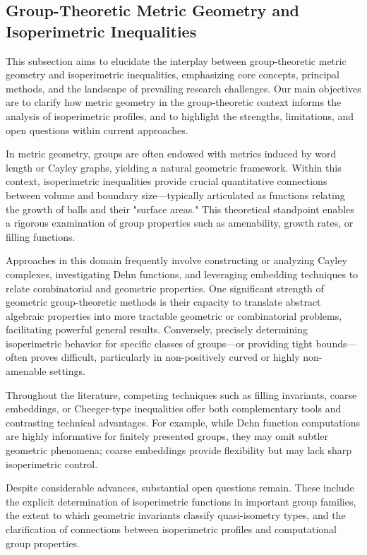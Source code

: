 \documentclass[sigconf]{acmart}
\begin{document}
\subsection{Group-Theoretic Metric Geometry and Isoperimetric Inequalities}

This subsection aims to elucidate the interplay between group-theoretic metric geometry and isoperimetric inequalities, emphasizing core concepts, principal methods, and the landscape of prevailing research challenges. Our main objectives are to clarify how metric geometry in the group-theoretic context informs the analysis of isoperimetric profiles, and to highlight the strengths, limitations, and open questions within current approaches.

In metric geometry, groups are often endowed with metrics induced by word length or Cayley graphs, yielding a natural geometric framework. Within this context, isoperimetric inequalities provide crucial quantitative connections between volume and boundary size---typically articulated as functions relating the growth of balls and their "surface areas." This theoretical standpoint enables a rigorous examination of group properties such as amenability, growth rates, or filling functions.

Approaches in this domain frequently involve constructing or analyzing Cayley complexes, investigating Dehn functions, and leveraging embedding techniques to relate combinatorial and geometric properties. One significant strength of geometric group-theoretic methods is their capacity to translate abstract algebraic properties into more tractable geometric or combinatorial problems, facilitating powerful general results. Conversely, precisely determining isoperimetric behavior for specific classes of groups---or providing tight bounds---often proves difficult, particularly in non-positively curved or highly non-amenable settings.

Throughout the literature, competing techniques such as filling invariants, coarse embeddings, or Cheeger-type inequalities offer both complementary tools and contrasting technical advantages. For example, while Dehn function computations are highly informative for finitely presented groups, they may omit subtler geometric phenomena; coarse embeddings provide flexibility but may lack sharp isoperimetric control.

Despite considerable advances, substantial open questions remain. These include the explicit determination of isoperimetric functions in important group families, the extent to which geometric invariants classify quasi-isometry types, and the clarification of connections between isoperimetric profiles and computational group properties.
\end{document}
